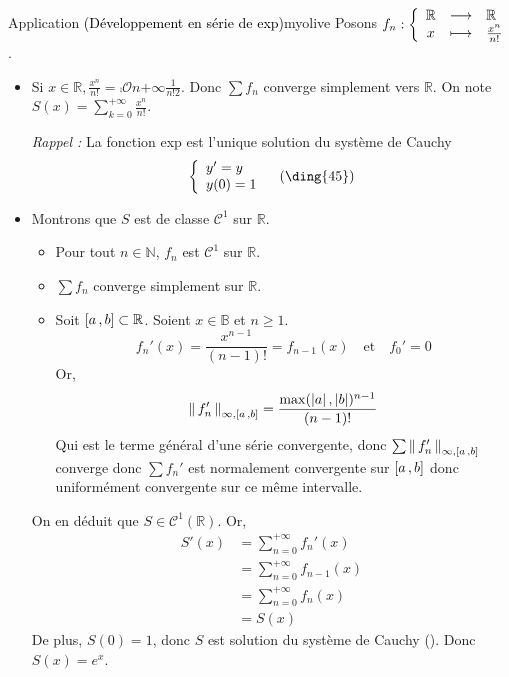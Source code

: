     \begin{omed}{Application \textcolor{black}{(Développement en série de exp)}}{myolive}
        Posons $\fonction{f_n}{\mathbb{R}}{\mathbb{R}}{x}{\frac{x^n}{n!}}$.

        \begin{itemize}
            \item Si $x \in \mathbb{R}, \frac{x^n}{n!} = \comp{\mathcal{O}}{n}{+\infty}{\frac{1}{n!2}}$. Donc $\sum f_n$ converge simplement vers $\mathbb{R}$. On note $S(x) = \sum_{k=0}^{+\infty} \frac{x^n}{n!}$.
            
            \textit{\textcolor{myolive}{Rappel :}} La fonction exp est l’unique solution du système de Cauchy \[ \et{y' = y}{y(0)=1} \quad \text{(\ding{45})} \]   

            \item Montrons que $S$ est de classe $\mathcal{C}^1$ sur $\mathbb{R}$.
            \begin{itemize}
                \item Pour tout $n \in \mathbb{N}$, $f_n$ est $\mathcal{C}^1$ sur $\mathbb{R}$.
                \item $\sum f_n$ converge simplement sur $\mathbb{R}$.
                \item Soit $\intervalleFF{a}{b} \subset \mathbb{R}$. Soient $x \in \mathbb{B}$ et $n \geq 1$.
                \[ f_n'(x) = \frac{x^{n-1}}{(n-1)!} = f_{n-1}(x) \quad \text{et} \quad f_0' = 0 \]
                Or, 
                \begin{align*}
                    \nnorm{\infty, \intervalleFF{a}{b}}{f_n'} 
                    &= \frac{\max(\abs{a}, \abs{b})^{n-1}}{(n-1)!} \\
                \end{align*}
                Qui est le terme général d’une série convergente, donc $\sum \nnorm{\infty,\intervalleFF{a}{b}}{f_n'}$ converge donc $\sum f_n'$ est normalement convergente sur $\intervalleFF{a}{b}$ donc uniformément convergente sur ce même intervalle. 
            \end{itemize}
            On en déduit que $S \in \mathcal{C^1}(\mathbb{R})$. Or,
            \begin{align*}
                S'(x)
                &= \sum_{n=0}^{+\infty} f_n'(x) \\
                &= \sum_{n=0}^{+\infty} f_{n-1}(x) \\
                &= \sum_{n=0}^{+\infty} f_n(x) \\
                &= S(x) 
            \end{align*}
            De plus, $S(0) = 1$, donc $S$ est solution du système de Cauchy (). Donc $S(x) = e^x$.
        \end{itemize}
    \end{omed}


